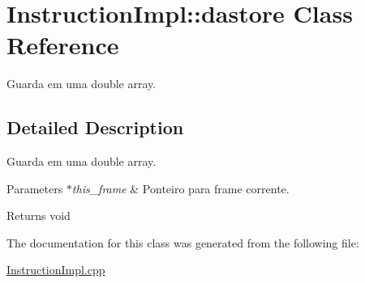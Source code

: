 \hypertarget{class_instruction_impl_1_1dastore}{}\section{Instruction\+Impl\+:\+:dastore Class Reference}
\label{class_instruction_impl_1_1dastore}


Guarda em uma double array.  




\subsection{Detailed Description}
Guarda em uma double array. 


\begin{DoxyParams}{Parameters}
{\em $\ast$this\+\_\+frame} & Ponteiro para frame corrente. \\
\hline
\end{DoxyParams}
\begin{DoxyReturn}{Returns}
void 
\end{DoxyReturn}


The documentation for this class was generated from the following file\+:\begin{DoxyCompactItemize}
\item 
\hyperlink{_instruction_impl_8cpp}{Instruction\+Impl.\+cpp}\end{DoxyCompactItemize}
